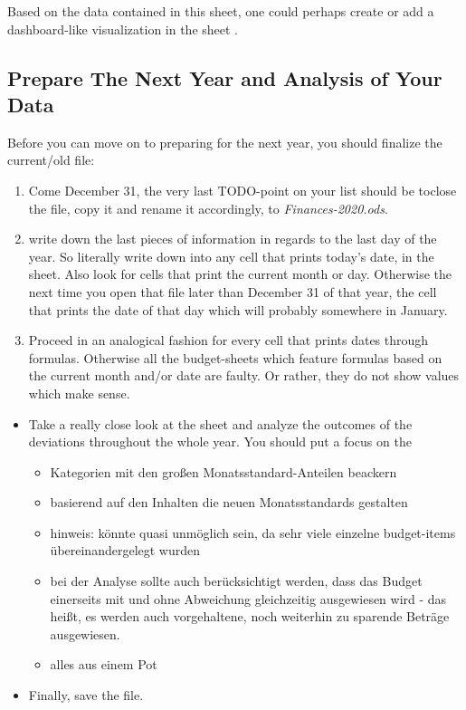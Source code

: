 Based on the data contained in this sheet, one could perhaps create or add a dashboard-like visualization in the sheet .


\subsection{Prepare The Next Year and Analysis of Your Data}
\label{subsec:prepare-the-next-year-analysis}

Before you can move on to preparing \tfn for the next year, you should finalize the current/old file:
\begin{enumerate}
	\item Come December 31, the very last TODO-point on your list should be toclose the file, copy it and rename it accordingly, \eg to \emph{Finances-2020.ods}.
	\item  write down the last pieces of information in regards to the last day of the year.
	So literally write down  into any cell that prints today's date, \eg in the  sheet.
	Also look for cells that print the current month or day.
	Otherwise the next time you open that file later than December 31 of that year, the cell that prints the date of that day which will probably somewhere in January.
	\item Proceed in an analogical fashion for every cell that prints dates through formulas.
	Otherwise all the budget-sheets which feature formulas based on the current month and/or date are faulty.
	Or rather, they do not show values which make sense.
\end{enumerate}

\begin{itemize}
	\item Take a really close look at the  sheet and analyze the outcomes of the deviations throughout the whole year.
	You should put a focus on the 
	\begin{itemize}
		\item Kategorien mit den großen Monatsstandard-Anteilen beackern
		\item basierend auf den Inhalten die neuen Monatsstandards gestalten
		\item hinweis: könnte quasi unmöglich sein, da sehr viele einzelne budget-items übereinandergelegt wurden
		\item bei der Analyse sollte auch berücksichtigt werden, dass das Budget einerseits mit und ohne Abweichung gleichzeitig ausgewiesen wird - das heißt, es werden auch vorgehaltene, noch weiterhin zu sparende Beträge ausgewiesen.
		\item alles aus einem Pot
	\end{itemize}	
	\item Finally, save the file.	
\end{itemize}

